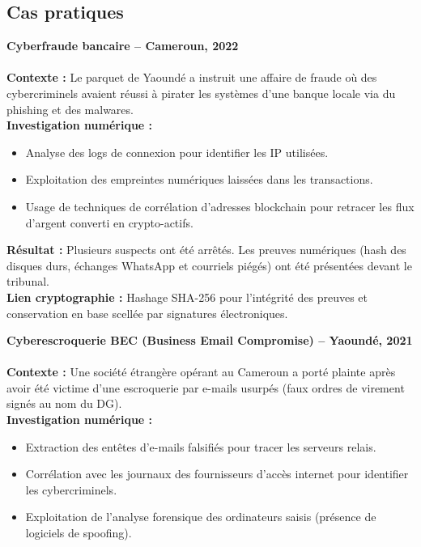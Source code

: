\documentclass[11pt]{article}
\begin{document}
\subsection{Cas pratiques}

\begin{itemize}
 \textbf{Cyberfraude bancaire – Cameroun, 2022}\\
 \\

\textbf{Contexte :} Le parquet de Yaoundé a instruit une affaire de fraude où des cybercriminels avaient réussi à pirater les systèmes d'une banque locale via du phishing et des malwares.\\

\textbf{Investigation numérique :}
\begin{itemize}
    \item Analyse des logs de connexion pour identifier les IP utilisées.
    \item Exploitation des empreintes numériques laissées dans les transactions.
    \item Usage de techniques de corrélation d'adresses blockchain pour retracer les flux d'argent converti en crypto-actifs.
\end{itemize}
\begin{itemize}

\textbf{Résultat :} Plusieurs suspects ont été arrêtés. Les preuves numériques (hash des disques durs, échanges WhatsApp et courriels piégés) ont été présentées devant le tribunal.\\

\textbf{Lien cryptographie :} Hashage SHA-256 pour l'intégrité des preuves et conservation en base scellée par signatures électroniques.

\textbf{ Cyberescroquerie BEC (Business Email Compromise) – Yaoundé, 2021}\\
\\

\textbf{Contexte :} Une société étrangère opérant au Cameroun a porté plainte après avoir été victime d'une escroquerie par e-mails usurpés (faux ordres de virement signés au nom du DG).\\

\textbf{Investigation numérique :}
\begin{itemize}
    \item Extraction des entêtes d’e-mails falsifiés pour tracer les serveurs relais.
    \item Corrélation avec les journaux des fournisseurs d’accès internet pour identifier les cybercriminels.
    \item Exploitation de l’analyse forensique des ordinateurs saisis (présence de logiciels de spoofing).
\end{itemize}


\end{itemize}
\end{itemize}
\end{document}
